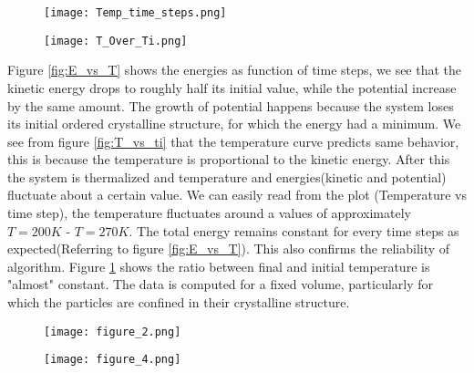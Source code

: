\documentclass[a4paper]{article}
\begin{document}
\begin{figure}[!htbp] 
\centering
\begin{minipage}{.5\textwidth}
	\centering
	\texttt{[image: Temp\_time\_steps.png]}
\captionsetup{width=0.7\linewidth}
    \label{fig:T_vs_ti}
\end{minipage}%
\begin{minipage}{.5\textwidth}
	\centering
	\texttt{[image: T\_Over\_Ti.png]}
    \captionsetup{width=0.7\linewidth}
    \label{fig:T_vs_ti2}
\end{minipage}
\end{figure}
Figure \ref{fig:E_vs_T} shows the energies as function of time steps, we see that the kinetic energy drops to roughly half its initial value, while the potential increase by the same amount. The growth of potential happens because the system loses its initial ordered crystalline structure, for which the energy had a minimum. We see from figure \ref{fig:T_vs_ti} that the temperature curve predicts same behavior, this is because the temperature is proportional to the kinetic energy. After this the system is thermalized and temperature and energies(kinetic and potential) fluctuate about a certain value. We can easily read from the plot (Temperature vs time step), the temperature fluctuates around a values of approximately $T = 200K$ - $T = 270K$.  The total energy remains constant for every time steps as expected(Referring to figure \ref{fig:E_vs_T}). This also confirms the reliability of algorithm. Figure \ref{fig:T_vs_ti2} shows the ratio between final and initial temperature is "almost" constant. The data is computed for a fixed volume, particularly for which the particles are confined in their crystalline structure. 

\begin{figure}[!htbp] 
\centering
\begin{minipage}{.5\textwidth}
	\centering
	\texttt{[image: figure\_2.png]}
\end{minipage}%
\begin{minipage}{.5\textwidth}
	\centering
	\texttt{[image: figure\_4.png]}
\end{minipage}
\captionsetup{width=0.7\linewidth}
\label{fig:D_1}
\end{figure}
\end{document}
